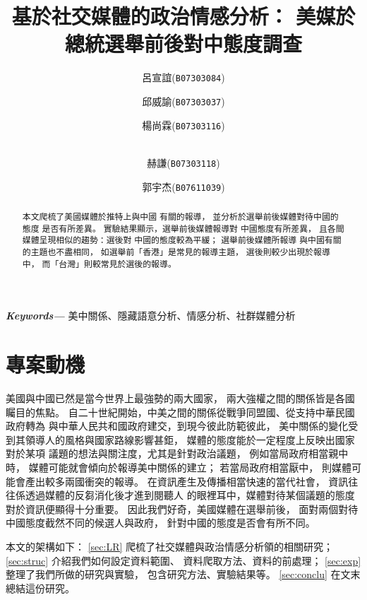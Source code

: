 \documentclass[12pt,twocolumn,letterpaper]{article}
\title{
		\LARGE\bf 
		基於社交媒體的政治情感分析：
		美媒於總統選舉前後對中態度調查 \\
}
\author[$\dagger$]{呂宣誼(\texttt{B07303084})}
\author[$\dagger\ddagger$]{邱威諭(\texttt{B07303037})}
\author[$\dagger$]{楊尚霖(\texttt{B07303116})}
\author[$\dagger$]{\\赫謙(\texttt{B07303118})}
\author[$\ddagger$]{郭宇杰(\texttt{B07611039})}
\affil[$\dagger$]{台大經濟系}
\affil[$\ddagger$]{台大資管系}
\date{\vspace{-5ex}}
\providecommand{\keywords}[1]
{
  \small	
  \textbf{\textit{Keywords---}} #1
}
\begin{document}
\maketitle

\begin{abstract}
    本文爬梳了美國媒體於推特上與中國
    有關的報導，
    並分析於選舉前後媒體對待中國的態度
    是否有所差異。
    實驗結果顯示，選舉前後媒體報導對
    中國態度有所差異，
    且各間媒體呈現相似的趨勢：選後對
    中國的態度較為平緩；
    選舉前後媒體所報導
    與中國有關的主題也不盡相同，
    如選舉前「香港」是常見的報導主題，
    選後則較少出現於報導中，
    而「台灣」則較常見於選後的報導。
\end{abstract}

\keywords{美中關係、隱藏語意分析、情感分析、社群媒體分析}



\section{專案動機}\label{sec:motiv}
美國與中國已然是當今世界上最強勢的兩大國家，
兩大強權之間的關係皆是各國矚目的焦點。
自二十世紀開始，中美之間的關係從戰爭同盟國、從支持中華民國政府轉為
與中華人民共和國政府建交，到現今彼此防範彼此，
美中關係的變化受到其領導人的風格與國家路線影響甚鉅，
媒體的態度能於一定程度上反映出國家對於某項
議題的想法與關注度，尤其是針對政治議題，
例如當局政府相當親中時，
媒體可能就會傾向於報導美中關係的建立；
若當局政府相當厭中，
則媒體可能會產出較多兩國衝突的報導。
在資訊產生及傳播相當快速的當代社會，
資訊往往係透過媒體的反芻消化後才進到閱聽人
的眼裡耳中，媒體對待某個議題的態度對於資訊便顯得十分重要。
因此我們好奇，美國媒體在選舉前後，
面對兩個對待中國態度截然不同的候選人與政府，
針對中國的態度是否會有所不同。

本文的架構如下：
\cref{sec:LR} 爬梳了社交媒體與政治情感分析領的相關研究；
\cref{sec:struc} 介紹我們如何設定資料範圍、
資料爬取方法、資料的前處理；
\cref{sec:exp} 整理了我們所做的研究與實驗，
包含研究方法、實驗結果等。
\cref{sec:conclu} 在文末總結這份研究。
\end{document}
